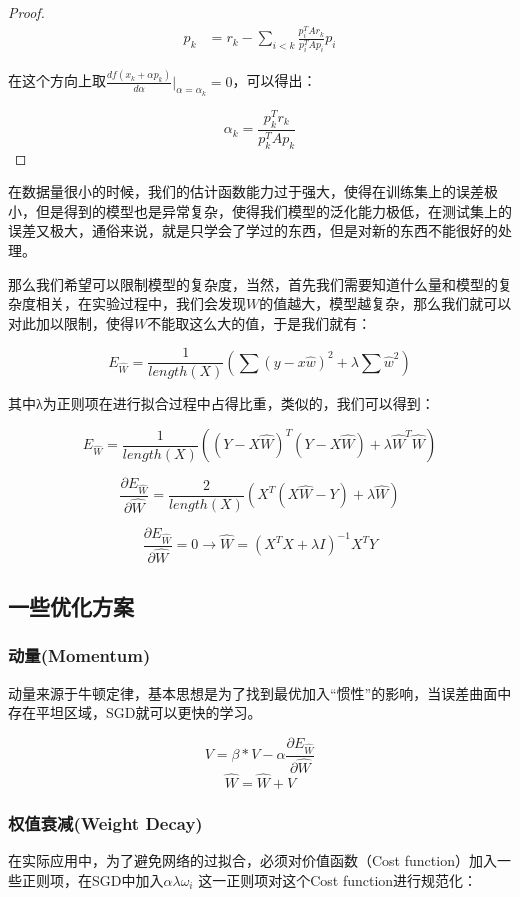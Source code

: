 \documentclass{ML}
\begin{document}
\begin{proof}
	\[\begin{array}{ll}
			p_k & = r_k - \sum_{i < k}\frac{p_i^TAr_k}{p_i^TAp_i}p_{i}
		\end{array}\]

	在这个方向上取\(\frac{df(x_k + \alpha p_k)}{d\alpha}|_{\alpha=\alpha_k} = 0\)，可以得出：

	\[\alpha_k = \frac{p_k^T r_k}{p_k^T A p_k}\]

\end{proof}

在数据量很小的时候，我们的估计函数能力过于强大，使得在训练集上的误差极小，但是得到的模型也是异常复杂，使得我们模型的泛化能力极低，在测试集上的误差又极大，通俗来说，就是只学会了学过的东西，但是对新的东西不能很好的处理。

那么我们希望可以限制模型的复杂度，当然，首先我们需要知道什么量和模型的复杂度相关，在实验过程中，我们会发现$W$的值越大，模型越复杂，那么我们就可以对此加以限制，使得$W$不能取这么大的值，于是我们就有：

$$E_{\hat{W}} = \frac{1}{length(X)} (∑(y - x \hat{w})^2 + λ∑\hat{w}^2)$$

其中λ为正则项在进行拟合过程中占得比重，类似的，我们可以得到：

$$E_{\hat{W}} = \frac{1}{length(X)} ((Y - X \hat{W})^T(Y - X \hat{W}) + λ\hat{W}^T\hat{W})$$

$$\frac{∂E_{\hat{W}}}{∂\hat{W}} = \frac{2}{length(X)} (X^T(X\hat{W} - Y) + λ\hat{W})$$

$$\frac{∂E_{\hat{W}}}{∂\hat{W}} = 0 → \hat{W} = (X^TX + λI)^{-1}X^TY$$

\subsection{一些优化方案}

\subsubsection{动量(Momentum)}

动量来源于牛顿定律，基本思想是为了找到最优加入“惯性”的影响，当误差曲面中存在平坦区域，SGD就可以更快的学习。

$$V = β * V - α\frac{∂E_{\hat{W}}}{∂\hat{W}}$$
$$\hat{W} = \hat{W} + V$$

\subsubsection{权值衰减(Weight Decay)}

在实际应用中，为了避免网络的过拟合，必须对价值函数（Cost function）加入一些正则项，在SGD中加入$\alpha \lambda \omega _{i}$ 这一正则项对这个Cost function进行规范化：
\end{document}
